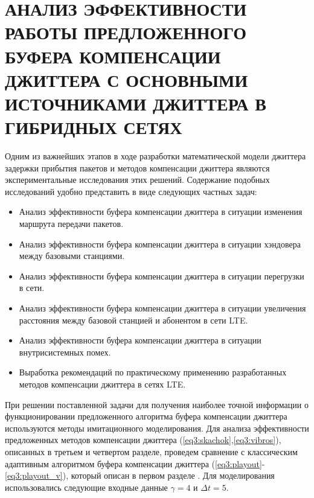 \chapter[ $ \ \ $ АНАЛИЗ $ \ \ \ $ ЭФФЕКТИВНОСТИ $ \ \ \ $ РАБОТЫ $ \ \ \ $ ПРЕДЛОЖЕННОГО $ \ \ $ БУФЕРА $ \ \ $ КОМПЕНСАЦИИ $ \ \ $ ДЖИТТЕРА $ \ $ С $ \ $ ОСНОВНЫМИ $ \ $ ИСТОЧНИКАМИ $ \ $ ДЖИТТЕРА В ГИБРИДНЫХ СЕТЯХ]{АНАЛИЗ ЭФФЕКТИВНОСТИ РАБОТЫ ПРЕДЛОЖЕННОГО БУФЕРА КОМПЕНСАЦИИ ДЖИТТЕРА С ОСНОВНЫМИ ИСТОЧНИКАМИ ДЖИТТЕРА В ГИБРИДНЫХ СЕТЯХ} \label{chapt4}

Одним из важнейших этапов в ходе разработки математической модели джиттера задержки прибытия пакетов и методов компенсации джиттера являются экспериментальные исследования этих решений.
Содержание подобных исследований удобно представить в виде следующих частных задач:
\begin{itemize}
 \item Анализ эффективности буфера компенсации джиттера в ситуации изменения маршрута передачи пакетов.
 \item Анализ эффективности буфера компенсации джиттера в ситуации хэндовера между базовыми станциями.
 \item Анализ эффективности буфера компенсации джиттера в ситуации перегрузки в сети.
 \item Анализ эффективности буфера компенсации джиттера в ситуации увеличения расстояния между базовой станцией и абонентом в сети LTE.
 \item Анализ эффективности буфера компенсации джиттера в ситуации внутрисистемных помех.
 \item Выработка рекомендаций по практическому применению разработанных методов компенсации джиттера в сетях LTE.
\end{itemize}
При решении поставленной задачи для получения наиболее точной информации о функционировании предложенного алгоритма буфера компенсации джиттера используются методы имитационного моделирования.
Для анализа эффективности предложенных методов компенсации джиттера (\ref{eq3:skachok},\ref{eq3:vibros}), описанных в третьем и четвертом разделе, проведем сравнение с классическим адаптивным алгоритмом буфера компенсации джиттера (\ref{eq3:playout}-\ref{eq3:playout_v}), который описан в первом разделе \cite{Ramjee}. 
Для моделирования использовались следующие входные данные $\gamma=4$ и $\Delta t=5$.


